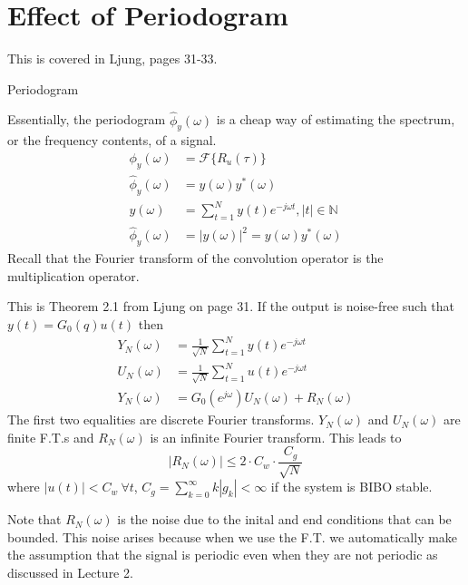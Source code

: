 \documentclass[lecture,12pt,]{pcms-l}
\theoremstyle{example}
\newcommand{\w}{\omega}
\begin{document}
\section{Effect of Periodogram}
This is covered in Ljung, pages 31-33.
\begin{definition}{Periodogram}

Essentially, the periodogram $\hat{\phi}_y(\w)$ is a cheap way of estimating the spectrum, or the frequency contents, of a signal.
\begin{align*}
\phi_y(\w) &= \mathcal{F}\{R_u(\tau)\} \\
\hat{\phi}_y(\w) &= y(\w)y^*(\w) \\
y(\w) &= \sum_{t=1}^Ny(t)e^{-j\w t}, |t|\in\mathbb{N} \\
\hat{\phi}_y(\w) &= |y(\w)|^2 = y(\w)y^*(\w)
\end{align*}
Recall that the Fourier transform of the convolution operator is the multiplication operator.
\end{definition}

\begin{theorem}
This is Theorem 2.1 from Ljung on page 31.
If the output is noise-free such that $y(t)=G_0(q)u(t)$ then
\begin{align*}
Y_N(\w) &= \frac{1}{\sqrt{N}}\sum_{t=1}^Ny(t)e^{-j\w t} \\
U_N(\w) &= \frac{1}{\sqrt{N}}\sum_{t=1}^Nu(t)e^{-j\w t} \\
Y_N(\w) &= G_0(e^{j\w})U_N(\w) + R_N(\w)
\end{align*}
The first two equalities are discrete Fourier transforms. $Y_N(\w)$ and $U_N(\w)$ are finite F.T.s and $R_N(\w)$ is an infinite Fourier transform. This leads to
$$|R_N(\w)| \leq 2\cdot C_w\cdot \frac{C_g}{\sqrt{N}}$$
where $|u(t)|<C_w ~\forall t$, $C_g=\sum_{k=0}^\infty k|g_k|<\infty$ if the system is BIBO stable.
\end{theorem}
Note that $R_N(\w)$ is the noise due to the inital and end conditions that can be bounded. This noise arises because when we use the F.T. we automatically make the assumption that the signal is periodic even when they are not periodic as discussed in Lecture 2.
\end{document}
